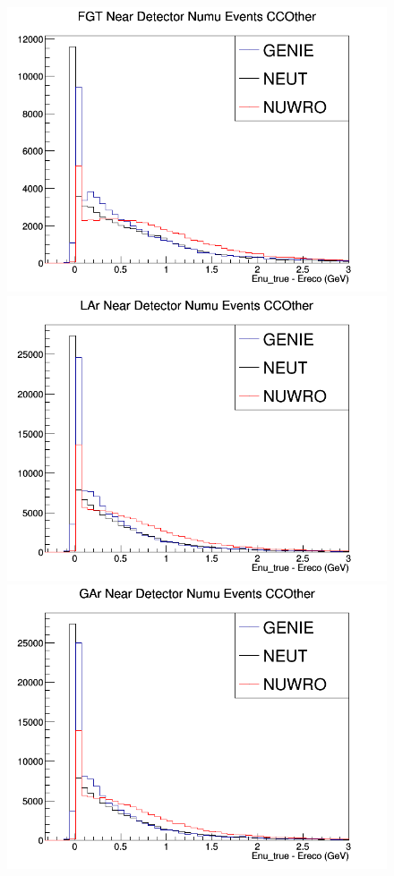 \documentclass[12pt]{article}
\begin{document}
\begin{figure}[h]
\endminipage
{}
\includegraphics[width=\linewidth]{Ereco_Etrue/numu_FGT_CCOther.png}
\endminipage
{}
\includegraphics[width=\linewidth]{Ereco_Etrue/numu_LAr_CCOther.png}
\endminipage
{}
\includegraphics[width=\linewidth]{Ereco_Etrue/numu_GAr_CCOther.png}
\endminipage
\newline
\end{figure}
\clearpage
\end{document}
